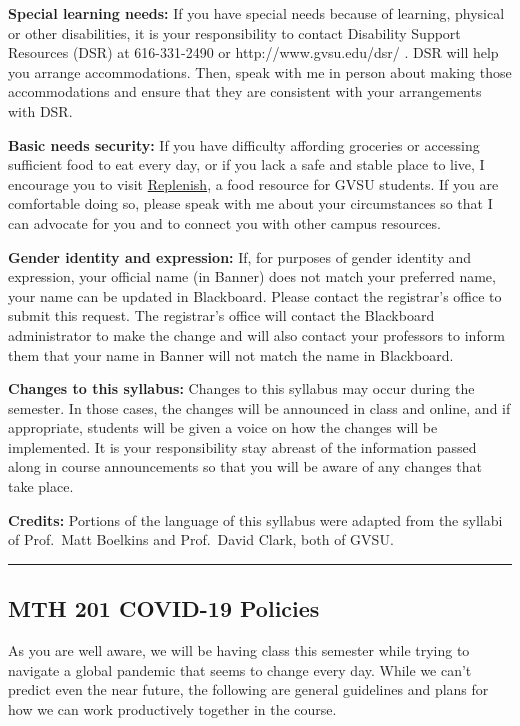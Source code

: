 \documentclass[]{article}
\begin{document}
\textbf{Special learning needs:} If you have special needs because of
learning, physical or other disabilities, it is your responsibility to
contact Disability Support Resources (DSR) at 616-331-2490 or
http://www.gvsu.edu/dsr/ . DSR will help you arrange accommodations.
Then, speak with me in person about making those accommodations and
ensure that they are consistent with your arrangements with DSR.

\textbf{Basic needs security:} If you have difficulty affording
groceries or accessing sufficient food to eat every day, or if you lack
a safe and stable place to live, I encourage you to visit
\href{https://www.gvsu.edu/replenish/}{Replenish}, a food resource for
GVSU students. If you are comfortable doing so, please speak with me
about your circumstances so that I can advocate for you and to connect
you with other campus resources.

\textbf{Gender identity and expression:} If, for purposes of gender
identity and expression, your official name (in Banner) does not match
your preferred name, your name can be updated in Blackboard. Please
contact the registrar's office to submit this request. The registrar's
office will contact the Blackboard administrator to make the change and
will also contact your professors to inform them that your name in
Banner will not match the name in Blackboard.

\textbf{Changes to this syllabus:} Changes to this syllabus may occur
during the semester. In those cases, the changes will be announced in
class and online, and if appropriate, students will be given a voice on
how the changes will be implemented. It is your responsibility stay
abreast of the information passed along in course announcements so that
you will be aware of any changes that take place.

\textbf{Credits:} Portions of the language of this syllabus were adapted
from the syllabi of Prof.~Matt Boelkins and Prof.~David Clark, both of
GVSU.

\begin{center}\rule{0.5\linewidth}{\linethickness}\end{center}

\hypertarget{mth-201-covid-19-policies}{%
\subsection{MTH 201 COVID-19 Policies}\label{mth-201-covid-19-policies}}

As you are well aware, we will be having class this semester while
trying to navigate a global pandemic that seems to change every day.
While we can't predict even the near future, the following are general
guidelines and plans for how we can work productively together in the
course.
\end{document}

